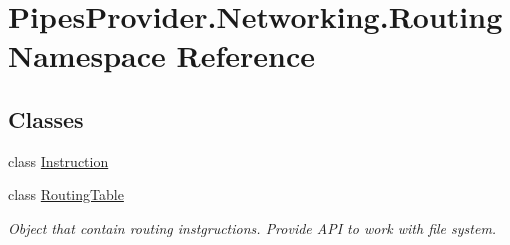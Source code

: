 \hypertarget{namespace_pipes_provider_1_1_networking_1_1_routing}{}\section{Pipes\+Provider.\+Networking.\+Routing Namespace Reference}
\label{namespace_pipes_provider_1_1_networking_1_1_routing}
\subsection*{Classes}
\begin{DoxyCompactItemize}
\item 
class \mbox{\hyperlink{class_pipes_provider_1_1_networking_1_1_routing_1_1_instruction}{Instruction}}
\item 
class \mbox{\hyperlink{class_pipes_provider_1_1_networking_1_1_routing_1_1_routing_table}{Routing\+Table}}
\begin{DoxyCompactList}\small\item\em Object that contain routing instgructions. Provide A\+PI to work with file system. \end{DoxyCompactList}\end{DoxyCompactItemize}

